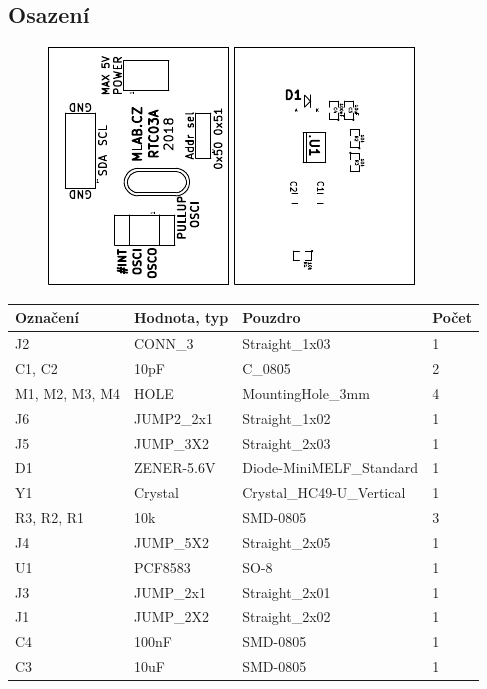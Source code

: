\subsection{Osazení}


\begin{figure}[ht!]
	\centering
	\includegraphics[scale=2]{../../doc/src/RTC03A-top_cropped.pdf}
	\qquad
	\includegraphics[scale=2]{../../doc/src/RTC03A-bottom_cropped.pdf}
\end{figure}

\begin{center}
  \begin{tabular}{ | l | l | l | l |}
    \hline
    Označení & Hodnota, typ & Pouzdro & Počet \\ \hline
    \hline
			J2 & CONN\_3 & Straight\_1x03 & 1\\ \hline
			C1, C2 & 10pF & C\_0805 & 2\\ \hline
			M1, M2, M3, M4 & HOLE & MountingHole\_3mm & 4\\ \hline
			J6 & JUMP2\_2x1 & Straight\_1x02 & 1\\ \hline
			J5 & JUMP\_3X2 & Straight\_2x03 & 1\\ \hline
			D1 & ZENER-5.6V & Diode-MiniMELF\_Standard & 1\\ \hline
			Y1 & Crystal & Crystal\_HC49-U\_Vertical & 1\\ \hline
			R3, R2, R1 & 10k & SMD-0805 & 3\\ \hline
			J4 & JUMP\_5X2 & Straight\_2x05 & 1\\ \hline
			U1 & PCF8583 & SO-8 & 1\\ \hline
			J3 & JUMP\_2x1 & Straight\_2x01 & 1\\ \hline
			J1 & JUMP\_2X2 & Straight\_2x02 & 1\\ \hline
			C4 & 100nF & SMD-0805 & 1\\ \hline
			C3 & 10uF & SMD-0805 & 1\\ \hline
	
  \end{tabular}
\end{center}